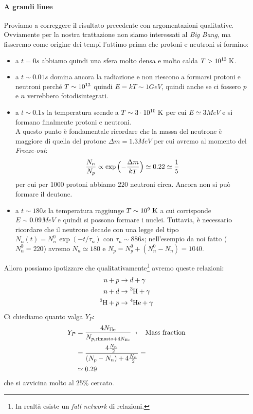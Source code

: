 \paragraph{A grandi linee}\label{a.grandi.linee} Proviamo a correggere il risultato precedente con argomentazioni qualitative. Ovviamente per la nostra trattazione non siamo interessati al \textit{Big Bang}, ma fisseremo come origine dei tempi l'attimo prima che protoni e neutroni si formino: 
\begin{itemize}
    \item a $t=0\unit{s}$ abbiamo quindi una sfera molto densa e molto calda $T>10^{13}\;\mbox{K}$.  
    \item a $t\sim 0.01\unit{s}$ domina ancora la radiazione e non riescono a formarsi protoni e neutroni perché $T\sim10^{13}$ quindi $E=kT\sim 1\unit{GeV}$, quindi anche se ci fossero $p$ e $n$ verrebbero fotodisintegrati.
    \item a $t\sim 0.1\unit{s}$ la temperatura scende a $T\sim 3\cdot10^{10}\;\mbox{K}$ per cui $E\simeq 3\unit{MeV}$ e si formano finalmente protoni e neutroni.\\ 
    A questo punto è fondamentale ricordare che la massa del neutrone è maggiore di quella del protone $\Delta m = 1.3\unit{MeV}$ per cui avremo al momento del \textit{Freeze-out}:
    $$\frac{N_n}{N_p}\propto \exp{\Bigl ( -\frac{\Delta m}{kT} \Bigr )} \simeq 0.22 \simeq \frac{1}{5}$$
    per cui per 1000 protoni abbiamo 220 neutroni circa. Ancora non si può formare il deutone.
    \item a $t\sim 180\unit{s}$ la temperatura raggiunge $T\sim 10^{9}\;\mbox{K}$ a cui corrisponde $E\sim 0.09\unit{MeV}$ e quindi si possono formare i nuclei. Tuttavia, è necessario ricordare che il neutrone decade con una legge del tipo $N_n(t) = N_n^0 \, \exp{(-t/\tau_n)}$ con $\tau_n \sim 886\unit{s}$; nell'esempio da noi fatto ($N_n^0= 220$) avremo $N_n \simeq 180$ e $N_p = N_p^0 + (N_n^0-N_n) = 1040$.
\end{itemize}
\noindent Allora possiamo ipotizzare che qualitativamente\footnote{In realtà esiste un \textit{full network} di relazioni.} avremo queste relazioni:
\begin{displaymath}
\begin{aligned}
n + p &\to d + \gamma \\
n + d &\to \ce{^3H} + \gamma \\
\ce{^3H} + p &\to \ce{^4He} + \gamma
\end{aligned}
\end{displaymath}
Ci chiediamo quanto valga $Y_P$:
\begin{displaymath}
\begin{aligned}
Y_P &= \frac{4 N_{\ce{He}}}{N_{p,\text{rimasto} + 4N_{\ce{He}} }} \;\leftarrow\: \text{Mass fraction}\\
&= \frac{4 \frac{N_n}{2}}{(N_p - N_n) + 4\frac{N_n}{2}} = \\
&\simeq 0.29
\end{aligned}
\end{displaymath}
che si avvicina molto al 25\% cercato.




    